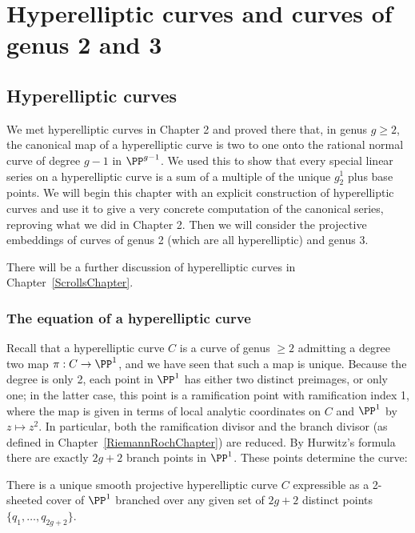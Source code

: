 

\chapter{Hyperelliptic curves and curves of genus 2 and 3}\label{genus 2 and 3 chapter}

\section{Hyperelliptic curves}\label{hyperelliptic}
 
We met hyperelliptic curves in Chapter 2 and proved there that, in genus $g \geq 2$, the canonical
map of a hyperelliptic curve is two to one onto the rational normal curve of degree $g-1$ in $\PP^{g-1}$. We used this to show that every special linear series on a hyperelliptic curve is a sum of a multiple of  the 
unique $g^1_2$ plus base points. We will begin this chapter with an explicit construction of hyperelliptic curves and use it to give a very concrete computation of the canonical series, reproving what we did in Chapter 2. Then we will consider the projective embeddings of curves of genus 2 (which are all hyperelliptic) and genus 3.
 
There will be a further discussion of hyperelliptic curves in Chapter~\ref{ScrollsChapter}.
  
 \subsection{The equation of a hyperelliptic curve}
 
Recall that a hyperelliptic curve $C$ is a curve of genus $\geq 2$ admitting a degree two map $\pi : C \to \PP^1$, and we have seen that such a map is unique. Because the degree is only 2, each point in $\PP^1$ has either two distinct preimages, or only one; in the latter case, this point is a ramification point with ramification index 1, where the map is given in terms of local analytic coordinates on $C$ and $\PP^1$ by $z \mapsto z^2$. In particular, both the ramification divisor and the branch divisor (as defined in Chapter~\ref{RiemannRochChapter}) are reduced. By  Hurwitz's formula there are exactly $2g+2$ branch points in $\PP^1$. These points determine the curve:
 
\begin{theorem}\label{hyperelliptic existence}
There is a unique smooth projective hyperelliptic curve $C$ expressible as a 2-sheeted cover of $\PP^1$ branched over any given set of $2g+2$ distinct points $\{q_{1}, \dots, q_{2g+2}\}$.
\end{theorem}

